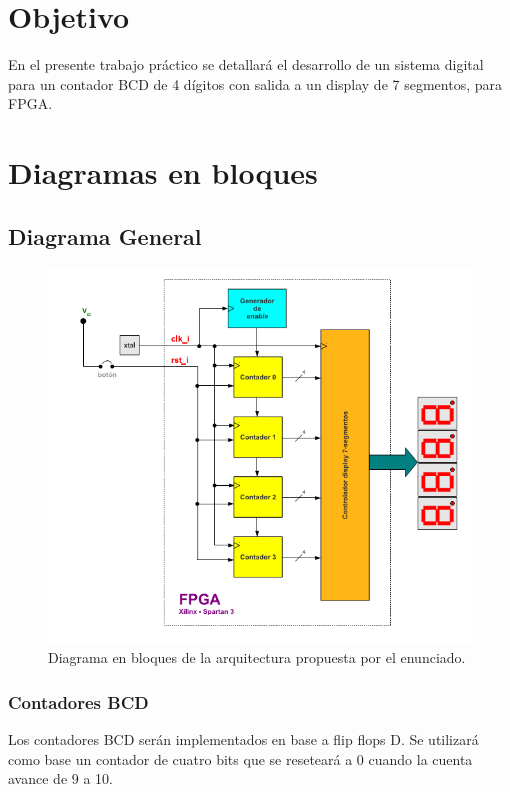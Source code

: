 \documentclass[a4paper,10pt]{article}
\begin{document}

\newpage
\tableofcontents
\newpage
\section{Objetivo}
En el presente trabajo práctico se detallará el desarrollo de un sistema digital para un contador BCD
de 4 dígitos con salida a un display de 7 segmentos, para FPGA.

\section{Diagramas en bloques}
	\subsection{Diagrama General}
	\begin{figure}[h]
		\centering
		\includegraphics{img/general.png}
		\caption{Diagrama en bloques de la arquitectura propuesta por el enunciado.}
	\end{figure}

\subsubsection{Contadores BCD}
Los contadores BCD serán implementados en base a flip flops D. Se utilizará como base un contador de cuatro bits que se reseteará a 0 cuando la cuenta avance de 9 a 10.
\end{document}
